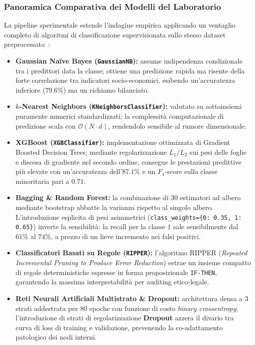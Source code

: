 \FloatBarrier
\subsubsection{Panoramica Comparativa dei Modelli del Laboratorio}
\label{subsec:dm-lab-comparison}

La pipeline sperimentale estende l'indagine empirica applicando un ventaglio completo di algoritmi di classificazione supervisionata sullo stesso dataset preprocessato~\cite{mannocci2026imbalanced}:
\begin{itemize}
    \item \textbf{Gaussian Naïve Bayes (\texttt{GaussianNB}):} assume indipendenza condizionale tra i predittori data la classe; ottiene una predizione rapida ma risente della forte correlazione tra indicatori socio-economici, esibendo un'accuratezza inferiore ($79.6\%$) ma un richiamo bilanciato.
    \item \textbf{$k$-Nearest Neighbors (\texttt{KNeighborsClassifier}):} valutato su sottoinsiemi puramente numerici standardizzati; la complessità computazionale di predizione scala con $\mathcal{O}(N \cdot d)$, rendendolo sensibile al rumore dimensionale.
    \item \textbf{XGBoost (\texttt{XGBClassifier}):} implementazione ottimizzata di Gradient Boosted Decision Trees; mediante regolarizzazione $L_1/L_2$ sui pesi delle foglie e discesa di gradiente nel secondo ordine, consegue le prestazioni predittive più elevate con un'accuratezza dell'$87.1\%$ e un $F_1$-score sulla classe minoritaria pari a $0.71$.
    \item \textbf{Bagging \& Random Forest:} la combinazione di $30$ estimatori ad albero mediante bootstrap abbatte la varianza rispetto al singolo albero. L'introduzione esplicita di pesi asimmetrici (\texttt{class\_weights=\{0: 0.35, 1: 0.65\}}) inverte la sensibilità: la recall per la classe $1$ sale sensibilmente dal $61\%$ al $74\%$, a prezzo di un lieve incremento nei falsi positivi.
    \item \textbf{Classificatori Basati su Regole (\texttt{RIPPER}):} l'algoritmo RIPPER (\textit{Repeated Incremental Pruning to Produce Error Reduction}) estrae un insieme compatto di regole deterministiche espresse in forma proposizionale \texttt{IF-THEN}, garantendo la massima interpretabilità per auditing etico-legale.
    \item \textbf{Reti Neurali Artificiali Multistrato \& Dropout:} architettura densa a 3 strati addestrata per 80 epoche con funzione di costo \textit{binary crossentropy}; l'introduzione di strati di regolarizzazione \textbf{Dropout} azzera il divario tra curva di loss di training e validazione, prevenendo la co-adattamento patologico dei nodi interni.
\end{itemize}

